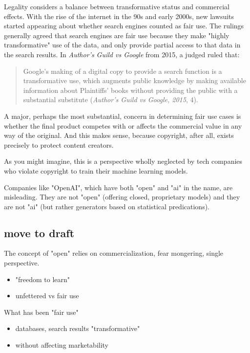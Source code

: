 \documentclass[11pt]{article}
\begin{document}
Legality considers a balance between transformative status and
commercial effects. With the rise of the internet in the 90s and early
2000s, new lawsuits started appearing about whether search engines
counted as fair use. The rulings generally agreed that search engines
are fair use because they make "highly transformative" use of the
data, and only provide partial access to that data in the search
results. In \emph{Author's Guild vs Google} from 2015, a judged ruled that:
\begin{quote}
Google’s making of a digital copy to provide a search function is a
transformative use, which augments public knowledge by making
available information about Plaintiffs’ books without providing the
public with a substantial substitute (\emph{Author's Guild vs Google,
2015}, 4).
\end{quote}
A major, perhaps the most substantial, concern in determining fair use
cases is whether the final product competes with or affects the
commercial value in any way of the original. And this makes sense,
because copyright, after all, exists precisely to protect content
creators.

As you might imagine, this is a perspective wholly neglected by tech
companies who violate copyright to train their machine learning
models.

Companies like "OpenAI", which have both "open" and "ai" in the name,
are misleading. They are not "open" (offering closed, proprietary
models) and they are not "ai" (but rather generators based on
statistical predications).



\subsection{move to draft}
\label{sec:org3184cdf}
The concept of "open" relies on commercialization, fear mongering,
single perspective. 
\begin{itemize}
\item "freedom to learn"
\item unfettered vs fair use
\end{itemize}



What has been "fair use"
\begin{itemize}
\item databases, search results "transformative"
\item without affecting marketability
\end{itemize}
\end{document}
